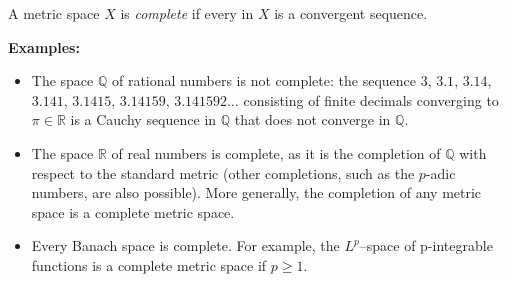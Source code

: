 \documentclass[12pt]{article}
\begin{document}
A metric space $X$ is {\em complete} if every  in $X$ is a convergent sequence.

{\bf Examples:}


\begin{itemize}
\item The space $\mathbb{Q}$ of rational numbers is not complete: the sequence $3$, $3.1$, $3.14$, $3.141$, $3.1415$, $3.14159$, $3.141592\ldots$ consisting of finite decimals converging to $\pi \in \mathbb{R}$ is a Cauchy sequence in $\mathbb{Q}$ that does not converge in $\mathbb{Q}$.
\item The space $\mathbb{R}$ of real numbers is complete, as it is the completion of $\mathbb{Q}$ with respect to the standard metric (other completions, such as the $p$-adic numbers, are also possible). More generally, the completion of any metric space is a complete metric space.
\item Every Banach space is complete. For example, the $L^p$--space of p-integrable functions is a complete metric space if $p \geq 1$.
\end{itemize}
\end{document}
